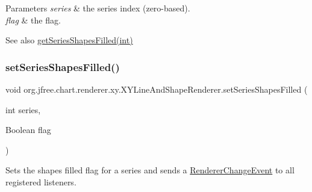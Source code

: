 \begin{DoxyParams}{Parameters}
{\em series} & the series index (zero-\/based). \\
\hline
{\em flag} & the flag.\\
\hline
\end{DoxyParams}
\begin{DoxySeeAlso}{See also}
\mbox{\hyperlink{classorg_1_1jfree_1_1chart_1_1renderer_1_1xy_1_1_x_y_line_and_shape_renderer_a8700a7f72b4dfbcdb1e2a7979a7a0840}{get\+Series\+Shapes\+Filled(int)}} 
\end{DoxySeeAlso}
\mbox{\label{classorg_1_1jfree_1_1chart_1_1renderer_1_1xy_1_1_x_y_line_and_shape_renderer_affefe89324f30c646e579244be329c2e}} 
\subsubsection{\texorpdfstring{set\+Series\+Shapes\+Filled()}{setSeriesShapesFilled()}\hspace{0.1cm}{\footnotesize\ttfamily [2/2]}}
{\footnotesize\ttfamily void org.\+jfree.\+chart.\+renderer.\+xy.\+X\+Y\+Line\+And\+Shape\+Renderer.\+set\+Series\+Shapes\+Filled (\begin{DoxyParamCaption}\item[{int}]{series,  }\item[{Boolean}]{flag }\end{DoxyParamCaption})}

Sets the \textquotesingle{}shapes filled\textquotesingle{} flag for a series and sends a \mbox{\hyperlink{}{Renderer\+Change\+Event}} to all registered listeners.


